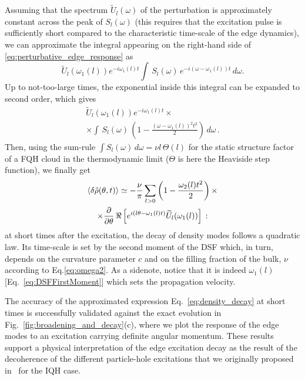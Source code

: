 \documentclass[twocolumn,pra,superscriptaddress,noshowpacs]{revtex4}
\begin{document}
Assuming that the spectrum $\widetilde{U}_{l}(\omega)$ of the perturbation is approximately constant across the peak of $S_l(\omega)$ (this requires that the excitation pulse is sufficiently short compared to the characteristic time-scale of the edge dynamics), we can approximate the integral appearing on the right-hand side of \eqref{eq:perturbative_edge_response} as
\begin{equation}
    \widetilde{U}_{l}(\omega_1(l)) e^{-i\omega_1(l) t} \int \,S_l(\omega) \,e^{-i(\omega-\omega_1(l)) t}\,d\omega.
\end{equation}
Up to not-too-large times, the exponential inside this integral can be expanded to second order, which gives
\begin{multline}
     \widetilde{U}_{l}(\omega_1(l)) e^{-i\omega_1(l) t} \times \\ \times \int \,S_l(\omega) \,\left(1 - \frac{(\omega-\omega_1(l))^2 t^2}{2}\right)\,d\omega\,.
\end{multline}
Then, using the sum-rule $\int S_l(\omega)\,d\omega=\nu l\,\Theta(l)$ for the static structure factor of a FQH cloud in the thermodynamic limit ($\Theta$ is here the Heaviside step function), we finally get
\begin{multline}
 \label{eq:density_decay}
\braket{\delta\hat{\rho}(\theta,t)}\simeq -\frac{\nu}{\pi}\sum_{l>0}\left(1 - \frac{\omega_2(l) t^2}{2}\right)\times\\ \times\frac{\partial}{\partial\theta} \,\Re \left[
     e^{i (l \theta-\omega_1(l) t)}
    \widetilde{U}_{l}(\omega_1(l))\right]\,:
\end{multline}
at short times after the excitation, the decay of density modes follows a quadratic law. Its time-scale is set by the second moment of the DSF which, in turn, depends on the curvature parameter $c$ and on the filling fraction of the bulk, $\nu$ according to Eq.\eqref{eq:omega2}. 
As a sidenote, notice that it is indeed $\omega_1(l)$ [Eq.~\eqref{eq:DSFFirstMoment}] which sets the propagation velocity.

The accuracy of the approximated expression Eq.~\eqref{eq:density_decay} at short times is successfully validated against the exact evolution in Fig.~\ref{fig:broadening_and_decay}(c), where we plot the response of the edge modes to an excitation carrying definite angular momentum. These results support 
a physical interpretation of the edge excitation decay as the result of the decoherence of the different particle-hole excitations that we originally proposed in~\cite{Nardin_EPL_2020} for the IQH case.
\end{document}
